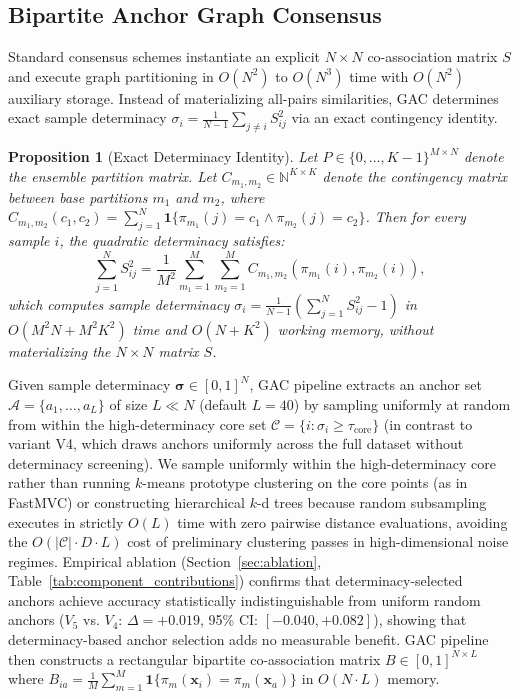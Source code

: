 \documentclass[pdflatex,sn-mathphys-num]{sn-jnl}
\theoremstyle{thmstyleone}
\newtheorem{proposition}[theorem]{Proposition}
\theoremstyle{thmstyletwo}
\theoremstyle{thmstylethree}
\begin{document}
\subsection{Bipartite Anchor Graph Consensus}\label{sec:anchor_consensus}
Standard consensus schemes instantiate an explicit $N \times N$ co-association matrix $S$ and execute graph partitioning in $O(N^2)$ to $O(N^3)$ time with $O(N^2)$ auxiliary storage. Instead of materializing all-pairs similarities, GAC determines exact sample determinacy $\sigma_i = \frac{1}{N - 1} \sum_{j \neq i} S_{ij}^2$ via an exact contingency identity.

\begin{proposition}[Exact Determinacy Identity]\label{prop:linear_determinacy}
Let $P \in \{0, \dots, K-1\}^{M \times N}$ denote the ensemble partition matrix. Let $C_{m_1, m_2} \in \mathbb{N}^{K \times K}$ denote the contingency matrix between base partitions $m_1$ and $m_2$, where $C_{m_1, m_2}(c_1, c_2) = \sum_{j=1}^N \mathbf{1}\{\pi_{m_1}(j)=c_1 \wedge \pi_{m_2}(j)=c_2\}$. Then for every sample $i$, the quadratic determinacy satisfies:
\begin{equation}
 \sum_{j=1}^N S_{ij}^2 = \frac{1}{M^2} \sum_{m_1=1}^M \sum_{m_2=1}^M C_{m_1, m_2}(\pi_{m_1}(i), \pi_{m_2}(i)),
\end{equation}
which computes sample determinacy $\sigma_i = \frac{1}{N-1}\left(\sum_{j=1}^N S_{ij}^2 - 1\right)$ in $O(M^2 N + M^2 K^2)$ time and $O(N + K^2)$ working memory, without materializing the $N \times N$ matrix $S$.
\end{proposition}

Given sample determinacy $\boldsymbol{\sigma} \in [0, 1]^N$, GAC pipeline extracts an anchor set $\mathcal{A} = \{a_1, \dots, a_L\}$ of size $L \ll N$ (default $L=40$) by sampling uniformly at random from within the high-determinacy core set $\mathcal{C} = \{i : \sigma_i \ge \tau_{\text{core}}\}$ (in contrast to variant V4, which draws anchors uniformly across the full dataset without determinacy screening). We sample uniformly within the high-determinacy core rather than running $k$-means prototype clustering on the core points (as in FastMVC) or constructing hierarchical $k$-d trees because random subsampling executes in strictly $O(L)$ time with zero pairwise distance evaluations, avoiding the $O(|\mathcal{C}| \cdot D \cdot L)$ cost of preliminary clustering passes in high-dimensional noise regimes. Empirical ablation (Section~\ref{sec:ablation}, Table~\ref{tab:component_contributions}) confirms that determinacy-selected anchors achieve accuracy statistically indistinguishable from uniform random anchors ($V_5$ vs. $V_4$: $\Delta = +0.019$, 95\% CI: $[-0.040, +0.082]$), showing that determinacy-based anchor selection adds no measurable benefit. GAC pipeline then constructs a rectangular bipartite co-association matrix $B \in [0, 1]^{N \times L}$ where $B_{ia} = \frac{1}{M}\sum_{m=1}^M \mathbf{1}\{\pi_m(\mathbf{x}_i) = \pi_m(\mathbf{x}_a)\}$ in $O(N \cdot L)$ memory.
\end{document}
